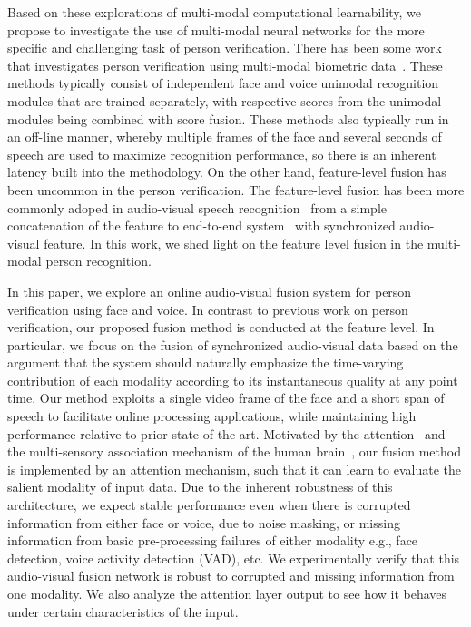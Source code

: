 \documentclass{article}
\begin{document}
Based on these explorations of multi-modal computational learnability, 
we propose to investigate the use of multi-modal neural networks for the more specific and challenging task of person verification. 
There has been some work that investigates person verification using multi-modal biometric data~\cite{Choudhury1999,Luque2006,Thomas2006,hazen07,Sargin2009,Sell2018multimodal}.
These methods typically consist of independent face and voice unimodal recognition modules that are trained separately, with respective scores from the unimodal modules being combined with score fusion.
These methods also typically run in an off-line manner, whereby multiple frames of the face and several seconds of speech are used to maximize recognition performance, so there is an inherent latency built into the methodology.
On the other hand, feature-level fusion has been uncommon in the person verification.
The feature-level fusion has been more commonly adoped in audio-visual speech recognition~\cite{Neti2000, Kratt2004} from a simple concatenation of the feature to end-to-end system~\cite{Sanabria2016, Petridis2018} with synchronized audio-visual feature.
In this work, we shed light on the feature level fusion in the multi-modal person recognition.

In this paper, we explore an online audio-visual fusion system for person verification using face and voice.
In contrast to previous work on person verification, our proposed fusion method is conducted at the feature level.
In particular, we focus on the fusion of synchronized audio-visual data based on the argument that the system should naturally emphasize the time-varying contribution of each modality according to its instantaneous quality at any point time. 
Our method exploits a single video frame of the face and a short span of speech to facilitate online processing applications, while maintaining high performance relative to prior state-of-the-art.
Motivated by the attention~\cite{corbetta2002control} and the multi-sensory association mechanism of the human brain~\cite{von2006implicit}, our fusion method is implemented by an attention mechanism, such that it can learn to evaluate the salient modality of input data.
Due to the inherent robustness of this architecture, we expect stable performance even when there is corrupted information from either face or voice, due to noise masking, or missing information from basic pre-processing failures of either modality e.g., face detection, voice activity detection (VAD), etc.
We experimentally verify that this audio-visual fusion network is robust to corrupted and missing information from one modality.
We also analyze the attention layer output to see how it behaves under certain characteristics of the input.
\end{document}

